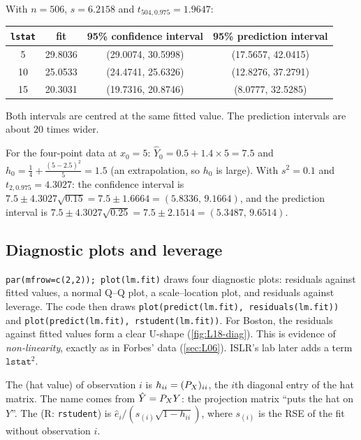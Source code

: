 \begin{example}[Boston]\label{ex:L18-predict}
With $n=506$, $s=6.2158$ and $t_{504,0.975}=1.9647$:
\begin{center}
\begin{tabular}{cccc}\hline
\texttt{lstat} & fit & 95\% confidence interval & 95\% prediction interval\\\hline
5 & 29.8036 & (29.0074, 30.5998) & (17.5657, 42.0415)\\
10 & 25.0533 & (24.4741, 25.6326) & (12.8276, 37.2791)\\
15 & 20.3031 & (19.7316, 20.8746) & (8.0777, 32.5285)\\\hline
\end{tabular}
\end{center}
Both intervals are centred at the same fitted value. The prediction intervals are about $20$ times wider.
\end{example}

\begin{example}[By hand]\label{ex:L18-hand}
For the four-point data at $x_0=5$: $\hat Y_0=0.5+1.4\times5=7.5$ and
$h_0=\frac14+\frac{(5-2.5)^2}{5}=1.5$ (an extrapolation, so $h_0$ is large). With $s^2=0.1$ and $t_{2,0.975}=4.3027$:
the confidence interval is $7.5\pm4.3027\sqrt{0.15}=7.5\pm1.6664=(5.8336,\,9.1664)$, and the prediction interval is
$7.5\pm4.3027\sqrt{0.25}=7.5\pm2.1514=(5.3487,\,9.6514)$.
\end{example}

\subsection{Diagnostic plots and leverage}
\texttt{par(mfrow=c(2,2)); plot(lm.fit)} draws four diagnostic plots: residuals against fitted values, a normal
Q--Q plot, a scale--location plot, and residuals against leverage. The code then draws
\texttt{plot(predict(lm.fit), residuals(lm.fit))} and \texttt{plot(predict(lm.fit), rstudent(lm.fit))}.
For Boston, the residuals against fitted values form a clear U-shape (\cref{fig:L18-diag}). This is evidence of
\emph{non-linearity}, exactly as in Forbes' data (\cref{sec:L06}). ISLR's lab later adds a term
$\texttt{lstat}^2$.

\begin{definition}[Leverage]\label{def:L18-leverage}
The  (hat value) of observation $i$ is $h_{ii}=(P_X)_{ii}$, the $i$th diagonal entry of the hat matrix.
The name comes from $\hat Y=P_X Y$: the projection matrix ``puts the hat on $Y$''. The
 (R: \texttt{rstudent}) is $\hat e_i/(s_{(i)}\sqrt{1-h_{ii}})$, where $s_{(i)}$ is the RSE of
the fit without observation $i$.
\end{definition}

